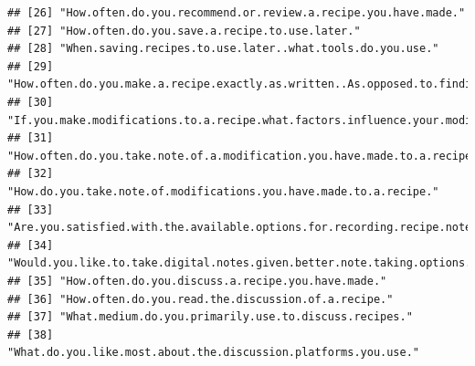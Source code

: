 \documentclass[
]{article}
\begin{document}
\begin{verbatim}
## [26] "How.often.do.you.recommend.or.review.a.recipe.you.have.made."                                                                                                                                              
## [27] "How.often.do.you.save.a.recipe.to.use.later."                                                                                                                                                              
## [28] "When.saving.recipes.to.use.later..what.tools.do.you.use."                                                                                                                                                  
## [29] "How.often.do.you.make.a.recipe.exactly.as.written..As.opposed.to.finding.a.recipe.that.exactly.matches.your.needs."                                                                                        
## [30] "If.you.make.modifications.to.a.recipe.what.factors.influence.your.modifications..Select.all.that.apply"                                                                                                    
## [31] "How.often.do.you.take.note.of.a.modification.you.have.made.to.a.recipe."                                                                                                                                   
## [32] "How.do.you.take.note.of.modifications.you.have.made.to.a.recipe."                                                                                                                                          
## [33] "Are.you.satisfied.with.the.available.options.for.recording.recipe.notes."                                                                                                                                  
## [34] "Would.you.like.to.take.digital.notes.given.better.note.taking.options."                                                                                                                                    
## [35] "How.often.do.you.discuss.a.recipe.you.have.made."                                                                                                                                                          
## [36] "How.often.do.you.read.the.discussion.of.a.recipe."                                                                                                                                                         
## [37] "What.medium.do.you.primarily.use.to.discuss.recipes."                                                                                                                                                      
## [38] "What.do.you.like.most.about.the.discussion.platforms.you.use."                                                                                                                                             

\end{verbatim}
\end{document}
